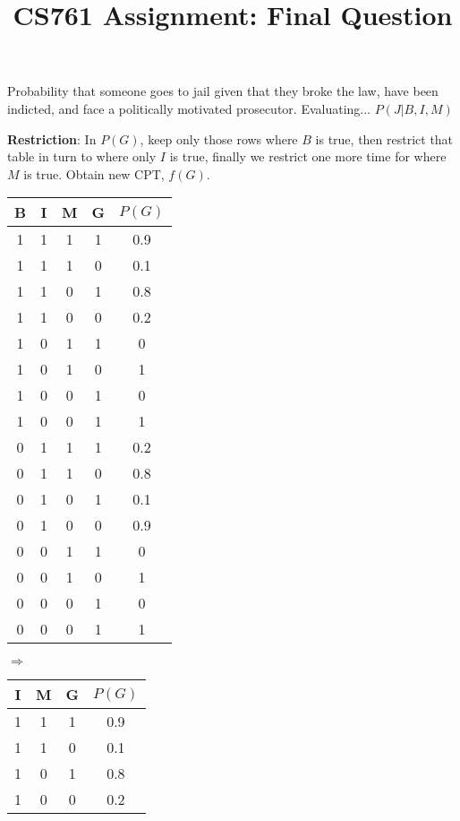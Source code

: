 \documentclass{article}
\begin{document}
\title{CS761 Assignment: Final Question}

\begin{flushright}
Probability that someone goes to jail given that they broke the law, have been indicted, and face a politically motivated prosecutor. Evaluating... $P(J | B, I, M)$
\end{flushright}

\textbf{Restriction}: In $P(G)$, keep only those rows where $B$ is true, then restrict that table in turn to where only $I$ is true, finally we restrict one more time for where $M$ is true. Obtain new CPT, $f(G)$.
\begin{center}
	\begin{tabular}{ |c c c c|c| }
	 \hline
	 B & I & M & G & $P(G)$ \\
	 \hline
	 1 & 1 & 1 & 1 & 0.9 \\
	 1 & 1 & 1 & 0 & 0.1 \\

	 1 & 1 & 0 & 1 & 0.8 \\
	 1 & 1 & 0 & 0 & 0.2 \\

	 1 & 0 & 1 & 1 & 0 \\
	 1 & 0 & 1 & 0 & 1 \\

	 1 & 0 & 0 & 1 & 0 \\
	 1 & 0 & 0 & 1 & 1 \\

	 0 & 1 & 1 & 1 & 0.2 \\
	 0 & 1 & 1 & 0 & 0.8 \\

	 0 & 1 & 0 & 1 & 0.1 \\
	 0 & 1 & 0 & 0 & 0.9 \\

	 0 & 0 & 1 & 1 & 0 \\
	 0 & 0 & 1 & 0 & 1 \\

	 0 & 0 & 0 & 1 & 0 \\
	 0 & 0 & 0 & 1 & 1 \\
	 \hline
	\end{tabular}
	$\Rightarrow$
	\begin{tabular}{ |c c c|c| }
	 \hline
	 I & M & G & $P(G)$ \\
	 \hline
	 1 & 1 & 1 & 0.9 \\
	 1 & 1 & 0 & 0.1 \\

	 1 & 0 & 1 & 0.8 \\
	 1 & 0 & 0 & 0.2 \\


\end{tabular}
\end{center}
\end{document}
